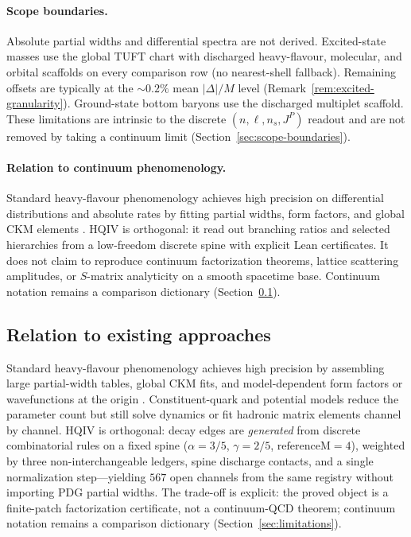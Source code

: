 \documentclass[11pt]{amsart}
\begin{document}
\paragraph{Scope boundaries.}
Absolute partial widths and differential spectra are not derived.
Excited-state masses use the global TUFT chart with discharged heavy-flavour,
molecular, and orbital scaffolds on every comparison row (no nearest-shell fallback).
Remaining offsets are typically at the $\sim 0.2\%$ mean $|\Delta|/M$ level
(Remark~\ref{rem:excited-granularity}).
Ground-state bottom baryons use the discharged multiplet scaffold.
These limitations are intrinsic to the discrete $(n,\ell,n_s,J^P)$ readout and are
not removed by taking a continuum limit (Section~\ref{sec:scope-boundaries}).

\paragraph{Relation to continuum phenomenology.}
Standard heavy-flavour phenomenology achieves high precision on differential
distributions and absolute rates by fitting partial widths, form factors, and global
CKM elements \cite{peskin1995,schwartz2014,pdg2024}.
HQIV is orthogonal: it read out branching ratios and selected hierarchies from a
low-freedom discrete spine with explicit Lean certificates.
It does not claim to reproduce continuum factorization theorems, lattice scattering
amplitudes, or $S$-matrix analyticity on a smooth spacetime base.
Continuum notation remains a comparison dictionary (Section~\ref{sec:existing-approaches}).

\subsection{Relation to existing approaches}
\label{sec:existing-approaches}

Standard heavy-flavour phenomenology achieves high precision by assembling
large partial-width tables, global CKM fits, and model-dependent form factors or
wavefunctions at the origin \cite{peskin1995,schwartz2014,pdg2024}.
Constituent-quark and potential models reduce the parameter count but still
solve dynamics or fit hadronic matrix elements channel by channel.
HQIV is orthogonal: decay edges are \emph{generated} from discrete combinatorial
rules on a fixed spine ($\alpha=3/5$, $\gamma=2/5$, $\mathrm{referenceM}=4$),
weighted by three non-interchangeable ledgers, spine discharge contacts, and a
single normalization step---yielding $567$ open channels from the same registry
without importing PDG partial widths.
The trade-off is explicit: the proved object is a finite-patch factorization
certificate, not a continuum-QCD theorem; continuum notation remains a comparison
dictionary (Section~\ref{sec:limitations}).
\end{document}
